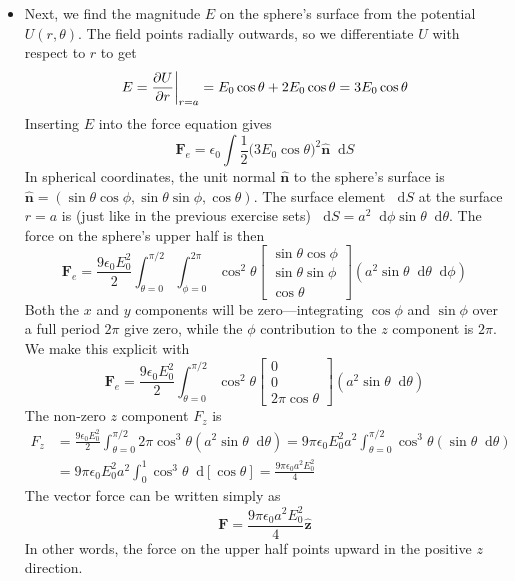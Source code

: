 \documentclass[11pt, a4paper]{article}
\newcommand{\diff}{\mathop{}\!\mathrm{d}} %
\renewcommand{\vec}[1]{\bm{#1}} %
\newcommand{\uvec}[1]{\hat{\vec{#1}}} %
\newcommand{\e}{\epsilon_{0}}  %
\begin{document}
\begin{itemize}
	\item Next, we find the magnitude $ E $ on the sphere's surface from the potential $ U(r, \theta) $. The field points radially outwards, so we differentiate $ U $ with respect to $ r $ to get
	\begin{equation*}
		E = \pdv{U}{r} \bigg |_{r = a} = E_{0} \cos \theta + 2 E_{0} \cos \theta = 3E_{0} \cos \theta
	\end{equation*}
	Inserting $ E $ into the force equation gives
	\begin{equation*}
		\vec{F}_{e} = \e \int \frac{1}{2}\big(3E_{0} \cos \theta\big)^{2} \uvec{n} \diff S
	\end{equation*}
	In spherical coordinates, the unit normal $ \uvec{n} $ to the sphere's surface is $ \uvec{n} = (\sin \theta \cos \phi, \sin \theta \sin \phi, \cos \theta) $. The surface element $ \diff S $ at the surface $ r = a $ is (just like in the previous exercise sets) $ \diff S = a^{2} \diff \phi \sin \theta \diff \theta $. The force on the sphere's upper half is then
	\begin{equation*}
		\vec{F}_{e} = \frac{9\e E_{0}^{2}}{2} \int_{\theta = 0}^{\pi/2}\int_{\phi = 0}^{2\pi} \cos^{2} \theta 
		\begin{bmatrix}
			\sin \theta \cos \phi\\
			\sin \theta \sin \phi\\
			\cos \theta
		\end{bmatrix}
		(a^{2} \sin \theta \diff \theta \diff \phi) 
	\end{equation*}
	Both the $ x $ and $ y $ components will be zero---integrating $ \cos \phi $ and $ \sin \phi $ over a full period $ 2 \pi $ give zero, while the $ \phi $ contribution to the $ z $ component is $ 2\pi $.  We make this explicit with
	\begin{equation*}
		\vec{F}_{e} = \frac{9\e E_{0}^{2}}{2} \int_{\theta = 0}^{\pi/2}\cos^{2} \theta 
		\begin{bmatrix}
			0\\
			0\\
			2\pi \cos \theta 
		\end{bmatrix}
		(a^{2} \sin \theta \diff \theta) 
	\end{equation*}
	The non-zero $ z $ component $ F_{z} $ is 
	\begin{align*}
		F_{z} &= \frac{9\e E_{0}^{2}}{2} \int_{\theta = 0}^{\pi/2}2\pi \cos^{3} \theta (a^{2} \sin \theta \diff \theta) = 9\pi\e E_{0}^{2}a^{2} \int_{\theta = 0}^{\pi/2} \cos^{3} \theta (\sin \theta \diff \theta)\\
		& =  9\pi\e E_{0}^{2}a^{2} \int_{0}^{1} \cos^{3} \theta \diff [\cos \theta] = \frac{9\pi\e a^{2} E_{0}^{2}}{4}
	\end{align*}
	The vector force can be written simply as
	\begin{equation*}
		\vec{F} = \frac{9\pi\e a^{2} E_{0}^{2}}{4} \uvec{z}
	\end{equation*}
	In other words, the force on the upper half points upward in the positive $ z $ direction.	
	
\end{itemize}
\end{document}
